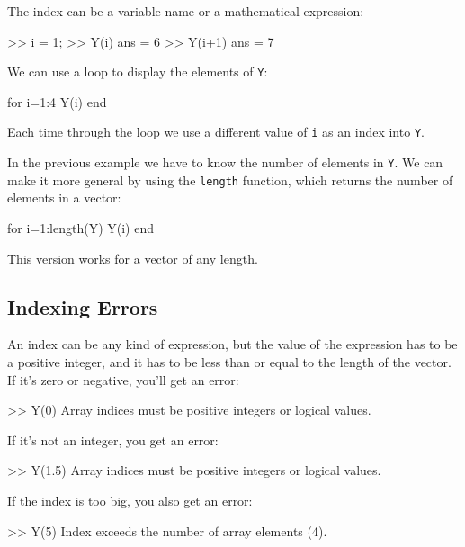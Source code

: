 The index can be a variable name or a mathematical expression:

\begin{code}
>> i = 1;
>> Y(i)
ans = 6
>> Y(i+1)
ans = 7
\end{code}

We can use a loop to display the elements of {\tt Y}:


\begin{code}
for i=1:4
     Y(i)
end
\end{code}

Each time through the loop we use a different value of {\tt i}
as an index into {\tt Y}.


In the previous example we have to know the number
of elements in {\tt Y}.  We can make it more general by using
the {\tt length} function, which returns the number of elements
in a vector:

\begin{code}
for i=1:length(Y)
     Y(i)
end
\end{code}

This version works for a vector of any length.


\subsection{Indexing Errors}


An index can be any kind of expression, but the value of the
expression has to be a positive integer, and it has to be
less than or equal to the length of the vector.  If it's
zero or negative, you'll get an error:

\begin{code}
>> Y(0)
Array indices must be positive integers or logical values.
\end{code}

If it's not an integer, you get an error:

\begin{code}
>> Y(1.5)
Array indices must be positive integers or logical values.
\end{code}

If the index is too big, you also get an error:

\begin{code}
>> Y(5)
Index exceeds the number of array elements (4).
\end{code}

